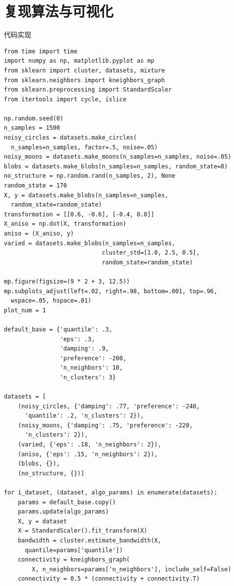 \documentclass[UTF8]{ctexart}
\begin{document}
\section{复现算法与可视化}
代码实现
\begin{lstlisting}[style=stylePy]
from time import time
import numpy as np, matplotlib.pyplot as mp
from sklearn import cluster, datasets, mixture
from sklearn.neighbors import kneighbors_graph
from sklearn.preprocessing import StandardScaler  
from itertools import cycle, islice

np.random.seed(0)  
n_samples = 1500
noisy_circles = datasets.make_circles(
  n_samples=n_samples, factor=.5, noise=.05)
noisy_moons = datasets.make_moons(n_samples=n_samples, noise=.05)
blobs = datasets.make_blobs(n_samples=n_samples, random_state=8)
no_structure = np.random.rand(n_samples, 2), None
random_state = 170
X, y = datasets.make_blobs(n_samples=n_samples, 
  random_state=random_state)
transformation = [[0.6, -0.6], [-0.4, 0.8]]
X_aniso = np.dot(X, transformation)
aniso = (X_aniso, y)
varied = datasets.make_blobs(n_samples=n_samples,
                            cluster_std=[1.0, 2.5, 0.5],
                            random_state=random_state)

mp.figure(figsize=(9 * 2 + 3, 12.5))
mp.subplots_adjust(left=.02, right=.98, bottom=.001, top=.96,
  wspace=.05, hspace=.01)
plot_num = 1

default_base = {'quantile': .3, 
                'eps': .3,  
                'damping': .9,  
                'preference': -200,
                'n_neighbors': 10,
                'n_clusters': 3}

datasets = [
    (noisy_circles, {'damping': .77, 'preference': -240, 
      'quantile': .2, 'n_clusters': 2}),
    (noisy_moons, {'damping': .75, 'preference': -220, 
      'n_clusters': 2}),
    (varied, {'eps': .18, 'n_neighbors': 2}),
    (aniso, {'eps': .15, 'n_neighbors': 2}),
    (blobs, {}),
    (no_structure, {})]

for i_dataset, (dataset, algo_params) in enumerate(datasets):
    params = default_base.copy()
    params.update(algo_params)
    X, y = dataset
    X = StandardScaler().fit_transform(X)
    bandwidth = cluster.estimate_bandwidth(X, 
      quantile=params['quantile'])
    connectivity = kneighbors_graph(
        X, n_neighbors=params['n_neighbors'], include_self=False)
    connectivity = 0.5 * (connectivity + connectivity.T)


\end{lstlisting}
\end{document}
